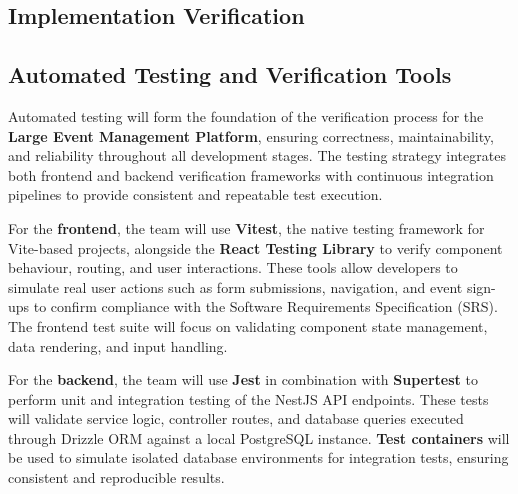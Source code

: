 \documentclass[12pt, titlepage]{article}
\begin{document}
\subsection{Implementation Verification}




\subsection{Automated Testing and Verification Tools}

Automated testing will form the foundation of the verification process for the \textbf{Large Event Management Platform}, ensuring correctness, maintainability, and reliability throughout all development stages. The testing strategy integrates both frontend and backend verification frameworks with continuous integration pipelines to provide consistent and repeatable test execution.

For the \textbf{frontend}, the team will use \textbf{Vitest}, the native testing framework for Vite-based projects, alongside the \textbf{React Testing Library} to verify component behaviour, routing, and user interactions. These tools allow developers to simulate real user actions such as form submissions, navigation, and event sign-ups to confirm compliance with the Software Requirements Specification (SRS). The frontend test suite will focus on validating component state management, data rendering, and input handling.

For the \textbf{backend}, the team will use \textbf{Jest} in combination with \textbf{Supertest} to perform unit and integration testing of the NestJS API endpoints. These tests will validate service logic, controller routes, and database queries executed through Drizzle ORM against a local PostgreSQL instance. \textbf{Test containers} will be used to simulate isolated database environments for integration tests, ensuring consistent and reproducible results.
\end{document}
